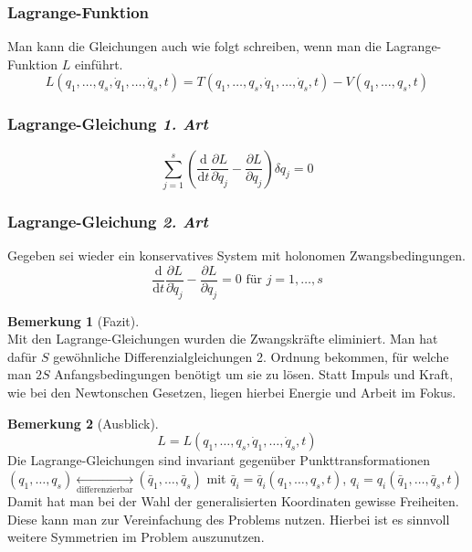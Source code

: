 \documentclass[oneside]{book}
\theoremstyle{definition}
\newtheorem*{bemerkung*}{Bemerkung}
\renewcommand{\d}{\mathrm d}
\newcommand{\dd}[1]{\frac{\d}{\d #1}}
\newcommand{\ffpartial}[2]{\frac{\partial #1}{\partial #2}}
\newcommand{\vardots}[2]{#1_1, \dots, #1_#2}
\begin{document}
\subsubsection{Lagrange-Funktion}
Man kann die Gleichungen auch wie folgt schreiben, wenn man die Lagrange-Funktion $L$ einführt.
$$L(q_1, \dots, q_s, \dot{q}_1, \dots, \dot{q}_s, t) = T(q_1, \dots, q_s, \dot{q}_1, \dots, \dot{q}_s, t) - V(q_1, \dots, q_s, t)$$

\subsubsection{Lagrange-Gleichung \textit{1. Art}}
$$\sum_{j = 1}^s  (  \dd{t} \ffpartial{L}{\dot{q}_j} - \ffpartial{L}{q_j}  ) \delta q_j = 0$$

\subsubsection{Lagrange-Gleichung \textit{2. Art}}
Gegeben sei wieder ein konservatives System mit holonomen Zwangsbedingungen.
$$ \dd{t} \ffpartial{L}{\dot{q}_j} - \ffpartial{L}{q_j} = 0 \text{~für~} j= 1, \dots, s$$

\begin{bemerkung*}[Fazit]~\\
	Mit den Lagrange-Gleichungen wurden die Zwangskräfte eliminiert. Man hat dafür $S$ gewöhnliche Differenzialgleichungen 2. Ordnung bekommen, für welche man $2S$ Anfangsbedingungen benötigt um sie zu lösen.
	Statt Impuls und Kraft, wie bei den Newtonschen Gesetzen, liegen hierbei Energie und Arbeit im Fokus.
\end{bemerkung*}

\begin{bemerkung*}[Ausblick]
	$$L = L(\vardots{q}{s}, \vardots{\dot{q}}{s}, t)$$
	Die Lagrange-Gleichungen sind invariant gegenüber Punkttransformationen \\
	$(\vardots{q}{s}) \underset{\text{differenzierbar}}{\leftrightarrow} (\vardots{\bar{q}}{s})$ mit $\bar{q}_i = \bar{q}_i(\vardots{q}{s}, t)$, $q_i = q_i(\vardots{\bar{q}}{s}, t)$
	Damit hat man bei der Wahl der generalisierten Koordinaten gewisse Freiheiten. Diese kann man zur Vereinfachung des Problems nutzen. Hierbei ist es sinnvoll weitere Symmetrien im Problem auszunutzen.
\end{bemerkung*}
\end{document}
